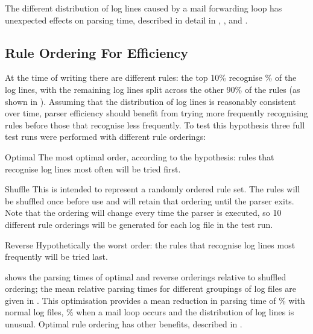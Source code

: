The different distribution of log lines caused by a mail forwarding loop
has unexpected effects on parsing time, described in detail in
, , and .


\subsection{Rule Ordering For Efficiency}

\label{rule ordering for efficiency}

At the time of writing there are \numberOFrules{} different rules: the top
10\% recognise \% of the log lines, with
the remaining log lines split across the other 90\% of the rules (as shown
in ).  Assuming that the distribution of log
lines is reasonably consistent over time, parser efficiency should benefit
from trying more frequently recognising rules before those that recognise
less frequently.  To test this hypothesis three full test runs were
performed with different rule orderings:

\begin{eqlist}

    \item [Optimal]  The most optimal order, according to the hypothesis:
        rules that recognise log lines most often will be tried first.

    \item [Shuffle] This is intended to represent a randomly ordered rule
        set.  The rules will be shuffled once before use and will retain
        that ordering until the parser exits.  Note that the ordering will
        change every time the parser is executed, so 10 different rule
        orderings will be generated for each log file in the test run.

    \item [Reverse] Hypothetically the worst order: the rules that
        recognise log lines most frequently will be tried last.

\end{eqlist}

 shows the
parsing times of optimal and reverse orderings relative to shuffled
ordering; the mean relative parsing times for different groupings of log
files are given in .  This optimisation provides a mean reduction in parsing time of
\%
with normal log files,
\%
when a mail loop occurs and the distribution of log lines is unusual.
Optimal rule ordering has other benefits, described in
.


